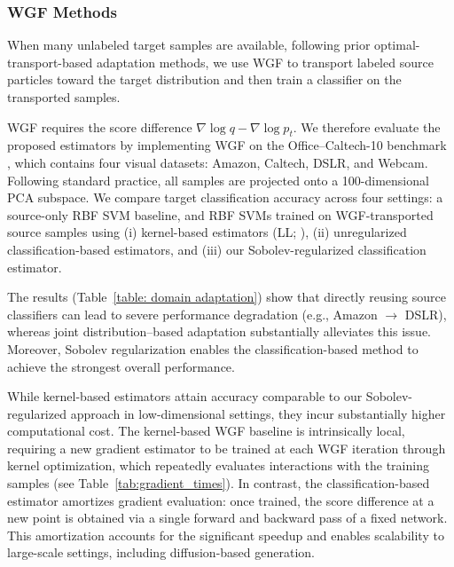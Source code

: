 \documentclass[11pt]{article}
\theoremstyle{plain}
\theoremstyle{definition}
\theoremstyle{remark}
\begin{document}
\subsubsection{WGF Methods}\label{subsec:WGF}
When many unlabeled target samples are available, following prior optimal-transport-based adaptation methods\cite{liu2023minimizing}, we use WGF to transport labeled source particles toward the target distribution and then train a classifier on the transported samples.

WGF requires the score difference $\nabla \log q - \nabla \log p_t$.
We therefore evaluate the proposed estimators by implementing WGF on the Office–Caltech-10 benchmark \cite{saenko2010adapting}, which contains four visual datasets: Amazon, Caltech, DSLR, and Webcam. Following standard practice, all samples are projected onto a 100-dimensional PCA subspace. We compare target classification accuracy across four settings: a source-only RBF SVM baseline, and RBF SVMs trained on WGF-transported source samples using (i) kernel-based estimators (LL; \cite{liu2023minimizing}), (ii) unregularized classification-based estimators, and (iii) our Sobolev-regularized classification estimator.


The results (Table~\ref{table: domain adaptation}) show that directly reusing source classifiers can lead to severe performance degradation (e.g., Amazon $\to$ DSLR), whereas joint distribution–based adaptation substantially alleviates this issue. Moreover, Sobolev regularization enables the classification-based method to achieve the strongest overall performance.


While kernel-based estimators attain accuracy comparable to our Sobolev-regularized approach in low-dimensional settings, they incur substantially higher computational cost. The kernel-based WGF baseline is intrinsically local, requiring a new gradient estimator to be trained at each WGF iteration through kernel optimization, which repeatedly evaluates interactions with the training samples (see Table~\ref{tab:gradient_times}). In contrast, the classification-based estimator amortizes gradient evaluation: once trained, the score difference at a new point is obtained via a single forward and backward pass of a fixed network. This amortization accounts for the significant speedup and enables scalability to large-scale settings, including diffusion-based generation.
\end{document}
